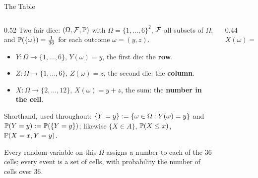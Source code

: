 \begin{frame}{The Table}
  \small
  \begin{columns}[T]
    \begin{column}{0.52\textwidth}
      Two fair dice: $(\Omega,\mathcal{F},\mathbb{P})$ with $\Omega=\{1,\dots,6\}^2$, $\mathcal{F}$ all subsets of $\Omega$, and $\mathbb{P}(\{\omega\})=\tfrac1{36}$ for each outcome $\omega=(y,z)$.
      \begin{itemize}
        \item $Y\colon\Omega\to\{1,\dots,6\}$, $Y(\omega)=y$, the first die: the \textbf{row}.
        \item $Z\colon\Omega\to\{1,\dots,6\}$, $Z(\omega)=z$, the second die: the \textbf{column}.
        \item $X\colon\Omega\to\{2,\dots,12\}$, $X(\omega)=y+z$, the sum: the \textbf{number in the cell}.
      \end{itemize}
      \smallskip
      Shorthand, used throughout: $\{Y=y\}:=\{\omega\in\Omega : Y(\omega)=y\}$ and $\mathbb{P}(Y=y):=\mathbb{P}(\{Y=y\})$; likewise $\{X\in A\}$, $\mathbb{P}(X\le x)$, $\mathbb{P}(X=x,Y=y)$.\par
      \smallskip
      Every random variable on this $\Omega$ assigns a number to each of the $36$ cells; every event is a set of cells, with probability the number of cells over $36$.
    \end{column}
    \begin{column}{0.44\textwidth}
      \centering
      $X(\omega)=y+z$\par\medskip
    \end{column}
  \end{columns}
\end{frame}


